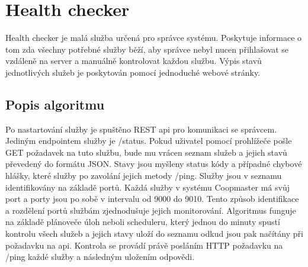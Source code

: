 \section{Health checker}\label{sec:health-checker}
Health checker je malá služba určená pro správce systému.
Poskytuje informace o tom zda všechny potřebné služby běží, aby správce nebyl nucen přihlašovat se vzdáleně na server a manuálně kontrolovat každou službu.
Výpis stavů jednotlivých služeb je poskytován pomocí jednoduché webové stránky.

\subsection*{Popis algoritmu}
Po nastartování služby je spuštěno REST api pro komunikaci se správcem.
Jediným endpointem služby je /status.
Pokud uživatel pomocí prohlížeče pošle GET požadavek na tuto službu, bude mu vrácen seznam služeb a jejich stavů převedený do formátu JSON.
Stavy jsou myšleny status kódy a případné chybové hlášky, které služby po zavolání jejich metody /ping.
Služby jsou v seznamu identifikovány na základě portů.
Každá služby v systému Coopmaster má svůj port a porty jsou po sobě v intervalu od 9000 do 9010.
Tento způsob identifikace a rozdělení portů službám zjednodušuje jejich monitorování.
Algoritmus funguje na základě plánoveče úloh neboli scheduleru, který jednou do minuty spustí kontrolu všech služeb a jejich stavy uloží do seznamu odkud jsou pak načítány při požadavku na api.
Kontrola se provádí právě posláním HTTP požadavku na /ping každé služby a následným uložením odpovědi.

